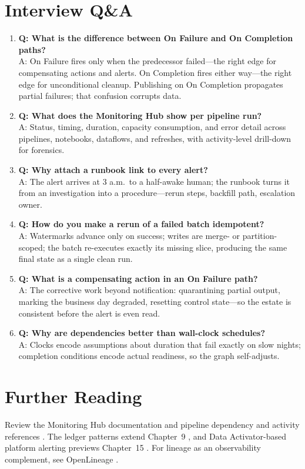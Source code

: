 \section{Interview Q\&A}
\begin{enumerate}
    \item \textbf{Q: What is the difference between On Failure and On Completion paths?}\\
    A: On Failure fires only when the predecessor failed---the right edge for compensating actions and alerts. On Completion fires either way---the right edge for unconditional cleanup. Publishing on On Completion propagates partial failures; that confusion corrupts data.
    \item \textbf{Q: What does the Monitoring Hub show per pipeline run?}\\
    A: Status, timing, duration, capacity consumption, and error detail across pipelines, notebooks, dataflows, and refreshes, with activity-level drill-down for forensics.
    \item \textbf{Q: Why attach a runbook link to every alert?}\\
    A: The alert arrives at 3 a.m.\ to a half-awake human; the runbook turns it from an investigation into a procedure---rerun steps, backfill path, escalation owner.
    \item \textbf{Q: How do you make a rerun of a failed batch idempotent?}\\
    A: Watermarks advance only on success; writes are merge- or partition-scoped; the batch re-executes exactly its missing slice, producing the same final state as a single clean run.
    \item \textbf{Q: What is a compensating action in an On Failure path?}\\
    A: The corrective work beyond notification: quarantining partial output, marking the business day degraded, resetting control state---so the estate is consistent before the alert is even read.
    \item \textbf{Q: Why are dependencies better than wall-clock schedules?}\\
    A: Clocks encode assumptions about duration that fail exactly on slow nights; completion conditions encode actual readiness, so the graph self-adjusts.
\end{enumerate}

\section{Further Reading}
Review the Monitoring Hub documentation \cite{microsoftFabricMonitoringHub} and pipeline dependency and activity references \cite{microsoftFabricPipelines,microsoftFabricDataFactory}. The ledger patterns extend Chapter~9 \cite{microsoftFabricCopyInto}, and Data Activator-based platform alerting previews Chapter~15 \cite{microsoftDataActivator}. For lineage as an observability complement, see OpenLineage \cite{openlineage}.

